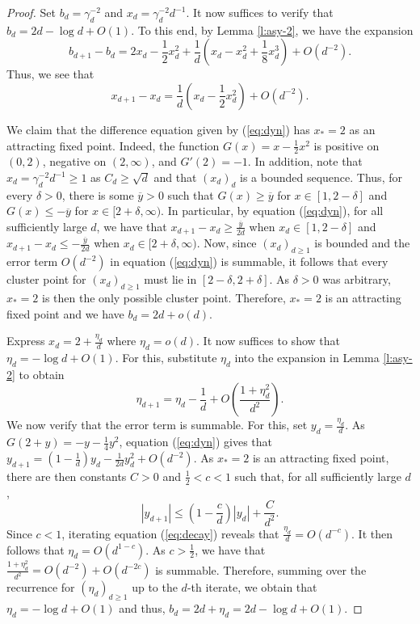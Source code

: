 \documentclass[10pt]{amsart}
\newcommand{\ol}{\overline}
\begin{document}
\begin{proof}
    Set $b_d = \gamma_d^{-2}$ and $x_d = \gamma_d^{-2}d^{-1}$. It now suffices to verify that $b_d = 2d-\log d+O(1)$. To this end, by Lemma \ref{l:asy-2}, we have the expansion
    \[
        b_{d+1}-b_d = 2x_d - \frac{1}{2}x_d^2 + \frac{1}{d}\left( x_d - x_d^2 + \frac{1}{8}x_d^3\right)  + O(d^{-2}).
    \]
    Thus, we see that
    \begin{equation}\label{eq:dyn}
        x_{d+1}-x_d = \frac{1}{d}\left( x_d - \frac{1}{2}x_d^2 \right) +O(d^{-2}).
    \end{equation}
    
    We claim that the difference equation given by (\ref{eq:dyn}) has $x_*=2$ as an attracting fixed point. Indeed, the function $G(x) = x- \frac{1}{2}x^2$ is positive on $(0,2)$, negative on $(2,\infty)$, and $G'(2)=-1$. In addition, note that $x_d = \gamma_d^{-2}d^{-1}\geq 1$ as $C_d\geq \sqrt{d}$ and that $(x_d)_d$ is a bounded sequence. Thus, for every $\delta>0$, there is some $\ol{y}>0$ such that $G(x) \geq \ol{y}$ for $x\in [1,2-\delta]$ and $G(x)\leq -\ol{y}$ for $x\in [2+\delta,\infty)$. In particular, by equation (\ref{eq:dyn}), for all sufficiently large $d$, we have that $x_{d+1}-x_d \geq \frac{\ol{y}}{2d}$ when $x_d\in[1,2-\delta]$ and $x_{d+1}-x_d \leq -\frac{\ol{y}}{2d}$ when $x_d\in[2+\delta, \infty)$. Now, since $(x_d)_{d\geq1}$ is bounded and the error term $O(d^{-2})$ in equation (\ref{eq:dyn}) is summable, it follows that every cluster point for $(x_d)_{d\geq1}$ must lie in $[2-\delta,2+\delta]$. As $\delta>0$ was arbitrary, $x_*=2$ is then the only possible cluster point. Therefore, $x_*=2$ is an attracting fixed point and we have $b_d = 2d+o(d)$.
    
    Express $x_d = 2+ \frac{\eta_d}{d}$ where $\eta_d = o(d)$. It now suffices to show that $\eta_d = -\log d+ O(1)$. For this, substitute $\eta_d$ into the expansion in Lemma \ref{l:asy-2} to obtain
    \begin{equation}\label{eq:boot-bound}
        \eta_{d+1} = \eta_d - \frac{1}{d} + O\left(\frac{1+\eta_d^2}{d^2}\right).
    \end{equation}
    We now verify that the error term is summable. For this, set $y_d = \frac{\eta_d}{d}$. As $G(2+y) = -y-\frac{1}{4}y^2$, equation (\ref{eq:dyn}) gives that $y_{d+1} = \left(1-\frac{1}{d} \right) y_d - \frac{1}{2d}y_d^2 + O(d^{-2})$. As $x_* = 2$ is an attracting fixed point, there are then constants $C>0$ and $\frac{1}{2}<c<1$ such that, for all sufficiently large $d$,
    \begin{equation}\label{eq:decay}
        \left| y_{d+1}\right| \leq \left( 1 - \frac{c}{d}\right)\left|y_d\right| + \frac{C}{d^2}.
    \end{equation}
    Since $c<1$, iterating equation (\ref{eq:decay}) reveals that $\frac{\eta_d}{d} = O(d^{-c})$. It then follows that $\eta_d = O(d^{1-c})$. As $c>\frac{1}{2}$, we have that $\frac{1+\eta_d^2}{d^2}= O(d^{-2})+O(d^{-2c})$ is summable. Therefore, summing over the recurrence for $(\eta_d)_{d\geq1}$ up to the $d$-th iterate, we obtain that $\eta_d = -\log d + O(1)$ and thus, $b_d = 2d+\eta_d = 2d-\log d + O(1)$.
\end{proof}




\end{document}

